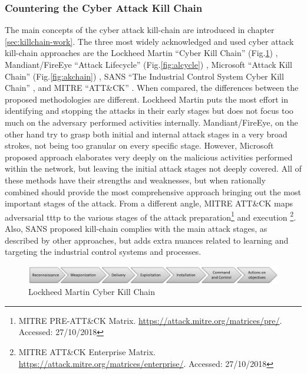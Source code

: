 \subsubsection{Countering the Cyber Attack Kill Chain}
\label{sec:killchain}
\glsresetall
The main concepts of the cyber attack kill-chain are introduced in chapter \ref{sec:killchain-work}. The three most widely acknowledged and used cyber attack kill-chain approaches are the Lockheed Martin ``Cyber Kill Chain'' (Fig.\ref{fig:ckchain}) \cite{LockheedMartin2018}, Mandiant/FireEye ``Attack Lifecycle'' (Fig.\ref{fig:alcycle}) \cite{FireEye2018}, Microsoft ``Attack Kill Chain'' (Fig.\ref{fig:akchain}) \cite{Microsoft2018}, SANS ``The Industrial Control System Cyber Kill Chain'' \cite{SANS-ICS}, and MITRE ``ATT\&CK'' \cite{MITRE-ATTACK}. When compared, the differences between the proposed methodologies are different. Lockheed Martin puts the most effort in identifying and stopping the attacks in their early stages but does not focus too much on the adversary performed activities internally. Mandiant/FireEye, on the other hand try to grasp both initial and internal attack stages in a very broad strokes, not being too granular on every specific stage. However, Microsoft proposed approach elaborates very deeply on the malicious activities performed within the network, but leaving the initial attack stages not deeply covered. All of these methods have their strengths and weaknesses, but when rationally combined should provide the most comprehensive approach bringing out the most important stages of the attack. From a different angle, MITRE ATT\&CK maps adversarial \gls{tttp} to the various stages of the attack preparation\footnote{MITRE PRE-ATT\&CK Matrix. \url{https://attack.mitre.org/matrices/pre/}. Accessed: 27/10/2018} and execution \footnote{MITRE ATT\&CK Enterprise Matrix. \url{https://attack.mitre.org/matrices/enterprise/}. Accessed: 27/10/2018}. Also, SANS proposed kill-chain complies with the main attack stages, as described by other approaches, but adds extra nuances related to learning and targeting the industrial control systems and processes.

\begin{figure}[!htb]
    \centering
    \includegraphics[width=1.0\textwidth]{./img/cyber-kill-chain.jpg}
    \caption{Lockheed Martin Cyber Kill Chain \cite{LockheedMartin2018}}
    \label{fig:ckchain}
\end{figure}

